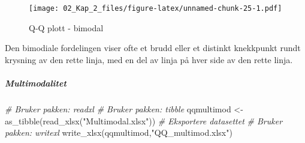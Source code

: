 \documentclass[
]{article}
\newenvironment{Shaded}{\begin{snugshade}}{\end{snugshade}}
\newcommand{\AttributeTok}[1]{\textcolor[rgb]{0.77,0.63,0.00}{#1}}
\newcommand{\CommentTok}[1]{\textcolor[rgb]{0.56,0.35,0.01}{\textit{#1}}}
\newcommand{\DecValTok}[1]{\textcolor[rgb]{0.00,0.00,0.81}{#1}}
\newcommand{\FunctionTok}[1]{\textcolor[rgb]{0.00,0.00,0.00}{#1}}
\newcommand{\NormalTok}[1]{#1}
\newcommand{\OtherTok}[1]{\textcolor[rgb]{0.56,0.35,0.01}{#1}}
\newcommand{\SpecialCharTok}[1]{\textcolor[rgb]{0.00,0.00,0.00}{#1}}
\newcommand{\StringTok}[1]{\textcolor[rgb]{0.31,0.60,0.02}{#1}}
\begin{document}
\begin{Shaded}
\end{Shaded}

\begin{figure}
\centering
\texttt{[image: 02\_Kap\_2\_files/figure-latex/unnamed-chunk-25-1.pdf]}
\caption{\label{fig:unnamed-chunk-25}Q-Q plott - bimodal}
\end{figure}

Den bimodiale fordelingen viser ofte et brudd eller et distinkt knekkpunkt rundt krysning av den rette linja, med en del av linja på hver side av den rette linja.

\hypertarget{multimodalitet}{%
\subparagraph{Multimodalitet}\label{multimodalitet}}

\begin{Shaded}
\begin{Highlighting}[]
\CommentTok{\# Bruker pakken: readxl}
\CommentTok{\# Bruker pakken: tibble}
\NormalTok{qqmultimod }\OtherTok{\textless{}{-}} \FunctionTok{as\_tibble}\NormalTok{(}\FunctionTok{read\_xlsx}\NormalTok{(}\StringTok{"Multimodal.xlsx"}\NormalTok{))}
\CommentTok{\# Eksportere datasettet}
\CommentTok{\# Bruker pakken: writexl}
\FunctionTok{write\_xlsx}\NormalTok{(qqmultimod,}\StringTok{"QQ\_multimod.xlsx"}\NormalTok{)}
\end{Highlighting}
\end{Shaded}
\end{document}
